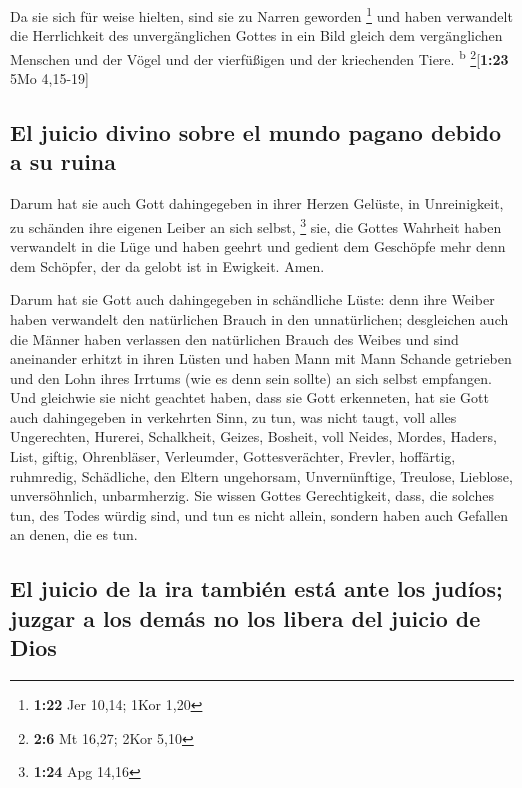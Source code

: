  Da sie sich für weise hielten, sind sie zu Narren
geworden \footnote{\textbf{1:22} Jer 10,14; 1Kor 1,20} 
und haben verwandelt die Herrlichkeit des unvergänglichen Gottes in ein
Bild gleich dem vergänglichen Menschen und der Vögel und der vierfüßigen
und der kriechenden Tiere. \textsuperscript{b}
\footnote{\textbf{2:6} Mt 16,27; 2Kor 5,10}{[}\textbf{1:23} 5Mo
4,15-19{]}

\hypertarget{el-juicio-divino-sobre-el-mundo-pagano-debido-a-su-ruina}{%
\subsection{El juicio divino sobre el mundo pagano debido a su
ruina}\label{el-juicio-divino-sobre-el-mundo-pagano-debido-a-su-ruina}}

 Darum hat sie auch Gott dahingegeben in ihrer Herzen
Gelüste, in Unreinigkeit, zu schänden ihre eigenen Leiber an sich
selbst, \footnote{\textbf{1:24} Apg 14,16}  sie, die
Gottes Wahrheit haben verwandelt in die Lüge und haben geehrt und
gedient dem Geschöpfe mehr denn dem Schöpfer, der da gelobt ist in
Ewigkeit. Amen.

 Darum hat sie Gott auch dahingegeben in schändliche
Lüste: denn ihre Weiber haben verwandelt den natürlichen Brauch in den
unnatürlichen;  desgleichen auch die Männer haben
verlassen den natürlichen Brauch des Weibes und sind aneinander erhitzt
in ihren Lüsten und haben Mann mit Mann Schande getrieben und den Lohn
ihres Irrtums (wie es denn sein sollte) an sich selbst empfangen.
 Und gleichwie sie nicht geachtet haben, dass sie Gott
erkenneten, hat sie Gott auch dahingegeben in verkehrten Sinn, zu tun,
was nicht taugt,  voll alles Ungerechten, Hurerei,
Schalkheit, Geizes, Bosheit, voll Neides, Mordes, Haders, List, giftig,
Ohrenbläser,  Verleumder, Gottesverächter, Frevler,
hoffärtig, ruhmredig, Schädliche, den Eltern ungehorsam, 
Unvernünftige, Treulose, Lieblose, unversöhnlich, unbarmherzig.
 Sie wissen Gottes Gerechtigkeit, dass, die solches tun,
des Todes würdig sind, und tun es nicht allein, sondern haben auch
Gefallen an denen, die es tun.

\hypertarget{el-juicio-de-la-ira-tambiuxe9n-estuxe1-ante-los-juduxedos-juzgar-a-los-demuxe1s-no-los-libera-del-juicio-de-dios}{%
\subsection{El juicio de la ira también está ante los judíos; juzgar a
los demás no los libera del juicio de
Dios}\label{el-juicio-de-la-ira-tambiuxe9n-estuxe1-ante-los-juduxedos-juzgar-a-los-demuxe1s-no-los-libera-del-juicio-de-dios}}

